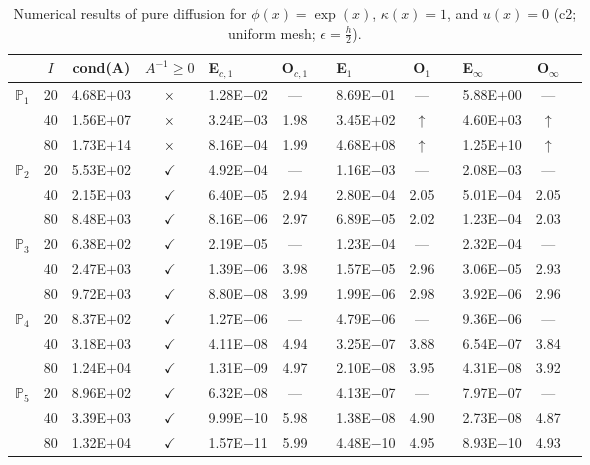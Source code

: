 \begin{table}[H]
\centering
\caption{Numerical results of pure diffusion for $\phi(x)=\exp(x)$, $\kappa(x)=1$, and $u(x)=0$ (c2; uniform mesh; $\epsilon=\frac{h}{2}$).}
\begin{tabular}{@{}l c c c l c c l c c l c c@{}}
\toprule
 & $I$ & cond(A) & $A^{-1}\geq 0$ &  E$_{c,1}$ & O$_{c,1}$ && E$_1$ & O$_1$ && E$_{\infty}$ & O$_{\infty}$\\
\midrule
\multirow{3}{*}{$\mathbb{P}_{1}$}
 & 20 & 4.68E$+$03 & $\times$ & 1.28E$-$02 & --- && 8.69E$-$01 & --- && 5.88E$+$00 & ---\\
 & 40 & 1.56E$+$07 & $\times$ & 3.24E$-$03 & 1.98 && 3.45E$+$02 & $\uparrow$ && 4.60E$+$03 & $\uparrow$\\
 & 80 & 1.73E$+$14 & $\times$ & 8.16E$-$04 & 1.99 && 4.68E$+$08 & $\uparrow$ && 1.25E$+$10 & $\uparrow$\\
\midrule
\multirow{3}{*}{$\mathbb{P}_{2}$}
 & 20 & 5.53E$+$02 & $\checkmark$ & 4.92E$-$04 & --- && 1.16E$-$03 & --- && 2.08E$-$03 & ---\\
 & 40 & 2.15E$+$03 & $\checkmark$ & 6.40E$-$05 & 2.94 && 2.80E$-$04 & 2.05 && 5.01E$-$04 & 2.05\\
 & 80 & 8.48E$+$03 & $\checkmark$ & 8.16E$-$06 & 2.97 && 6.89E$-$05 & 2.02 && 1.23E$-$04 & 2.03\\
\midrule
\multirow{3}{*}{$\mathbb{P}_{3}$}
 & 20 & 6.38E$+$02 & $\checkmark$ & 2.19E$-$05 & --- && 1.23E$-$04 & --- && 2.32E$-$04 & ---\\
 & 40 & 2.47E$+$03 & $\checkmark$ & 1.39E$-$06 & 3.98 && 1.57E$-$05 & 2.96 && 3.06E$-$05 & 2.93\\
 & 80 & 9.72E$+$03 & $\checkmark$ & 8.80E$-$08 & 3.99 && 1.99E$-$06 & 2.98 && 3.92E$-$06 & 2.96\\
\midrule
\multirow{3}{*}{$\mathbb{P}_{4}$}
 & 20 & 8.37E$+$02 & $\checkmark$ & 1.27E$-$06 & --- && 4.79E$-$06 & --- && 9.36E$-$06 & ---\\
 & 40 & 3.18E$+$03 & $\checkmark$ & 4.11E$-$08 & 4.94 && 3.25E$-$07 & 3.88 && 6.54E$-$07 & 3.84\\
 & 80 & 1.24E$+$04 & $\checkmark$ & 1.31E$-$09 & 4.97 && 2.10E$-$08 & 3.95 && 4.31E$-$08 & 3.92\\
\midrule
\multirow{3}{*}{$\mathbb{P}_{5}$}
 & 20 & 8.96E$+$02 & $\checkmark$ & 6.32E$-$08 & --- && 4.13E$-$07 & --- && 7.97E$-$07 & ---\\
 & 40 & 3.39E$+$03 & $\checkmark$ & 9.99E$-$10 & 5.98 && 1.38E$-$08 & 4.90 && 2.73E$-$08 & 4.87\\
 & 80 & 1.32E$+$04 & $\checkmark$ & 1.57E$-$11 & 5.99 && 4.48E$-$10 & 4.95 && 8.93E$-$10 & 4.93\\
\bottomrule
\end{tabular}
\end{table}